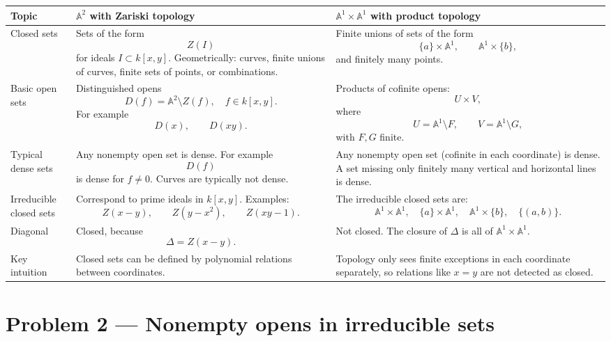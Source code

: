 \documentclass[12pt,a4paper]{article}
\theoremstyle{plain}
\theoremstyle{definition}      %
\begin{document}
\begin{center}
	\renewcommand{\arraystretch}{1.3}
	\begin{tabular}{|p{}|p{}|p{}|}
		\hline
		\textbf{Topic}
		&
		\textbf{$\mathbb A^2$ with Zariski topology}
		&
		\textbf{$\mathbb A^1\times \mathbb A^1$ with product topology}
		\\
		\hline
		Closed sets
		&
		Sets of the form
		\[
		Z(I)
		\]
		for ideals $I\subset k[x,y]$.
		Geometrically: curves, finite unions of curves, finite sets of points, or combinations.
		&
		Finite unions of sets of the form
		\[
		\{a\}\times \mathbb A^1,
		\qquad
		\mathbb A^1\times \{b\},
		\]
		and finitely many points.
		\\
		\hline
		Basic open sets
		&
		Distinguished opens
		\[
		D(f)=\mathbb A^2\setminus Z(f),
		\quad
		f\in k[x,y].
		\]
		For example
		\[
		D(x),
		\qquad
		D(xy).
		\]
		&
		Products of cofinite opens:
		\[
		U\times V,
		\]
		where
		\[
		U=\mathbb A^1\setminus F,
		\qquad
		V=\mathbb A^1\setminus G,
		\]
		with $F,G$ finite.
		\\
		\hline
		Typical dense sets
		&
		Any nonempty open set is dense.
		For example
		\[
		D(f)
		\]
		is dense for $f\neq 0$.
		Curves are typically not dense.
		&
		Any nonempty open set (cofinite in each coordinate) is dense.
		A set missing only finitely many vertical and horizontal lines is dense.
		\\
		\hline
		Irreducible closed sets
		&
		Correspond to prime ideals in $k[x,y]$.
		Examples:
		\[
		Z(x-y),
		\qquad
		Z(y-x^2),
		\qquad
		Z(xy-1).
		\]
		&
		The irreducible closed sets are:
		\[
		\mathbb A^1\times \mathbb A^1,
		\quad
		\{a\}\times \mathbb A^1,
		\quad
		\mathbb A^1\times\{b\},
		\quad
		\{(a,b)\}.
		\]
		\\
		\hline
		Diagonal
		&
		Closed, because
		\[
		\Delta
		=
		Z(x-y).
		\]
		&
		Not closed.
		The closure of $\Delta$ is all of $\mathbb A^1\times \mathbb A^1$.
		\\
		\hline
		Key intuition
		&
		Closed sets can be defined by polynomial relations between coordinates.
		&
		Topology only sees finite exceptions in each coordinate separately,
		so relations like $x=y$ are not detected as closed.
		\\
		\hline
	\end{tabular}
\end{center}


\clearpage

\section*{Problem 2 — Nonempty opens in irreducible sets}
\end{document}
